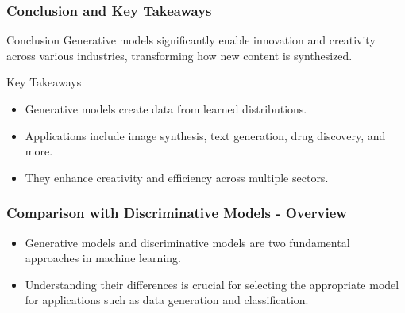 \documentclass[aspectratio=169]{beamer}
\begin{document}
\begin{frame}[fragile]
    \frametitle{Conclusion and Key Takeaways}
    \begin{block}{Conclusion}
        Generative models significantly enable innovation and creativity across various industries, transforming how new content is synthesized.
    \end{block}
    \begin{block}{Key Takeaways}
        \begin{itemize}
            \item Generative models create data from learned distributions.
            \item Applications include image synthesis, text generation, drug discovery, and more.
            \item They enhance creativity and efficiency across multiple sectors.
        \end{itemize}
    \end{block}
\end{frame}

\begin{frame}[fragile]
    \frametitle{Comparison with Discriminative Models - Overview}
    \begin{itemize}
        \item Generative models and discriminative models are two fundamental approaches in machine learning.
        \item Understanding their differences is crucial for selecting the appropriate model for applications such as data generation and classification.
    \end{itemize}
\end{frame}
\end{document}
